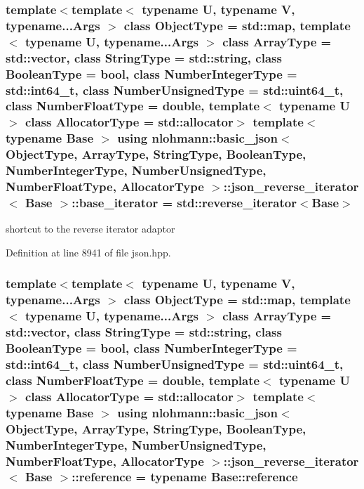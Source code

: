 \subsubsection[{base\+\_\+iterator}]{\setlength{\rightskip}{0pt plus 5cm}template$<$template$<$ typename U, typename V, typename...\+Args $>$ class Object\+Type = std\+::map, template$<$ typename U, typename...\+Args $>$ class Array\+Type = std\+::vector, class String\+Type  = std\+::string, class Boolean\+Type  = bool, class Number\+Integer\+Type  = std\+::int64\+\_\+t, class Number\+Unsigned\+Type  = std\+::uint64\+\_\+t, class Number\+Float\+Type  = double, template$<$ typename U $>$ class Allocator\+Type = std\+::allocator$>$ template$<$typename Base $>$ using {\bf nlohmann\+::basic\+\_\+json}$<$ Object\+Type, Array\+Type, String\+Type, Boolean\+Type, Number\+Integer\+Type, Number\+Unsigned\+Type, Number\+Float\+Type, Allocator\+Type $>$\+::{\bf json\+\_\+reverse\+\_\+iterator}$<$ Base $>$\+::{\bf base\+\_\+iterator} =  std\+::reverse\+\_\+iterator$<$Base$>$}\label{classnlohmann_1_1basic__json_1_1json__reverse__iterator_a9ebc4c99e6fc90c965af0f39ad2ca70e}


shortcut to the reverse iterator adaptor 



Definition at line 8941 of file json.\+hpp.

\hypertarget{classnlohmann_1_1basic__json_1_1json__reverse__iterator_a7265535f39299824f9712a2ca15013c3}{}
\subsubsection[{reference}]{\setlength{\rightskip}{0pt plus 5cm}template$<$template$<$ typename U, typename V, typename...\+Args $>$ class Object\+Type = std\+::map, template$<$ typename U, typename...\+Args $>$ class Array\+Type = std\+::vector, class String\+Type  = std\+::string, class Boolean\+Type  = bool, class Number\+Integer\+Type  = std\+::int64\+\_\+t, class Number\+Unsigned\+Type  = std\+::uint64\+\_\+t, class Number\+Float\+Type  = double, template$<$ typename U $>$ class Allocator\+Type = std\+::allocator$>$ template$<$typename Base $>$ using {\bf nlohmann\+::basic\+\_\+json}$<$ Object\+Type, Array\+Type, String\+Type, Boolean\+Type, Number\+Integer\+Type, Number\+Unsigned\+Type, Number\+Float\+Type, Allocator\+Type $>$\+::{\bf json\+\_\+reverse\+\_\+iterator}$<$ Base $>$\+::{\bf reference} =  typename Base\+::reference}\label{classnlohmann_1_1basic__json_1_1json__reverse__iterator_a7265535f39299824f9712a2ca15013c3}


